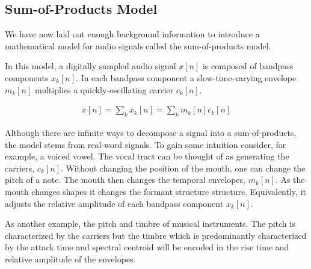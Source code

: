 \documentclass [11pt, proquest,oneside] {ganter_thesis}[2015/03/03]
\begin{document}
\subsection{Sum-of-Products Model}

We have now laid out enough background information to introduce a mathematical model for audio signals called the sum-of-products model.

In this model, a digitally sampled audio signal $x[n]$ is composed of bandpass components $x_k[n]$.  In each bandpass component a slow-time-varying envelope $m_k[n]$ multiplies a quickly-oscillating carrier $c_k[n]$.

\begin{align}
\label{eq:sum-of-products}
x[n] = \sum\limits_k x_k[n] = \sum\limits_k m_k[n] c_k[n]
\end{align}

Although there are infinite ways to decompose a signal into a sum-of-products, the model stems from real-word signals.  To gain some intuition consider, for example, a voiced vowel.  The vocal tract can be thought of as generating the carriers, $c_k[n]$.  Without changing the position of the mouth, one can change the pitch of a note.  The mouth then changes the temporal envelopes, $m_k[n]$.  As the mouth changes shapes it changes the formant structure structure.  Equivalently, it adjusts the relative amplitude of each bandpass component $x_k[n]$.

As another example, the pitch and timbre of musical instruments.  The pitch is characterized by the carriers but the timbre which is predominantly characterized by the attack time and spectral centroid \cite{kong2011temporal} will be encoded in the rise time and relative amplitude of the envelopes.

\end{document}
